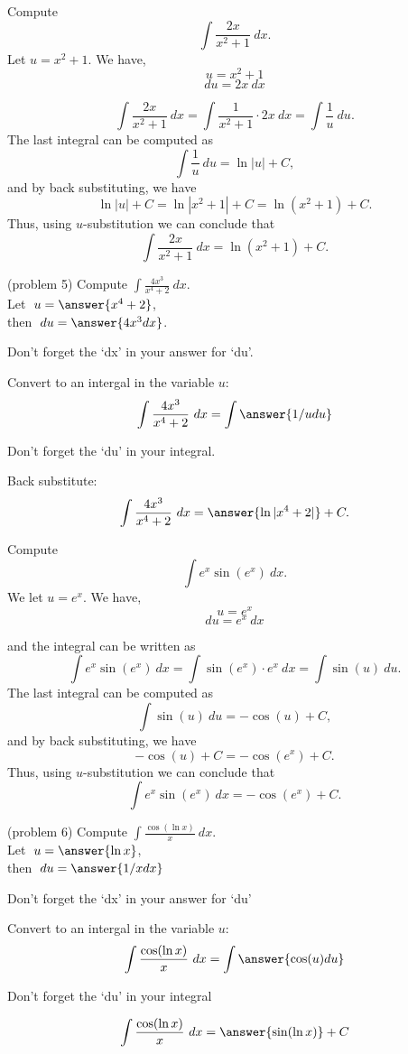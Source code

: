 \documentclass[handout]{ximera}
\begin{document}
\begin{example}[example 5] Compute 
\[\int \frac{2x}{x^2 + 1} \ dx.\]
Let $u = x^2 + 1$.  We have,
\[u = x^2 + 1\]
\[du = 2x \ dx\]

\[\int \frac{2x}{x^2 + 1} \ dx = \int \frac{1}{x^2 + 1} \cdot 2x\  dx = \int \frac{1}{u} \ du.\]
The last integral can be computed as 
\[\int \frac{1}{u} \ du = \ln|u| + C,\]
and by back substituting, we have 
\[\ln|u| + C =  \ln|x^2 + 1| + C=\ln(x^2 + 1) + C.\]
Thus, using $u$-substitution we can conclude that
\[\int \frac{2x}{x^2 + 1} \ dx =  \ln(x^2 + 1) + C.\]
\end{example}


\begin{problem} (problem 5) \hspace{0.2 in} Compute $\displaystyle{\int \frac{4x^3}{x^4 +2} \ dx}$.\\
Let $\;u = \answer{x^4 + 2}$,\\ 
then $\;du = \answer{4x^3 dx}$.\\
\begin{hint}
Don't forget the `dx' in your answer for `du'.
\end{hint}
Convert to an intergal in the variable $u$:
\[\int \frac{4x^3}{x^4 +2} \ dx = \int\answer{1/u du}\]
\begin{hint}
Don't forget the `du' in your integral.
\end{hint}
Back substitute:
\[\int \frac{4x^3}{x^4 +2} \ dx = \answer{\ln|x^4 +2|} +C.\]
\end{problem}



\begin{example}[example 6] Compute 
\[\int e^x\sin(e^x) \ dx.\]
We let $u = e^x$.  We have,
\[u = e^x\]
\[du = e^x \ dx\]

and the integral can be written as 
\[\int e^x\sin(e^x) \ dx = \int \sin(e^x) \cdot e^x \  dx = \int \sin(u) \ du.\]
The last integral can be computed as 
\[\int \sin(u) \ du = -\cos(u) + C,\]
and by back substituting, we have 
\[-\cos(u) + C = -\cos(e^x) + C.\]
Thus, using $u$-substitution we can conclude that
\[\int e^x\sin(e^x) \ dx =  -\cos(e^x) + C.\]
\end{example}




\begin{problem}(problem 6)
\hspace{.2 in} Compute $\displaystyle{\int \frac{\cos(\ln x)}{x} \ dx}$.\\
Let $\;u = \answer{\ln x}$, \\
then $\;du = \answer{1/x dx}$\\
\begin{hint}
Don't forget the `dx' in your answer for `du'
\end{hint}
Convert to an intergal in the variable $u$:
\[\int \frac{\cos(\ln x)}{x} \ dx = \int\answer{\cos(u) du}\]
\begin{hint}
Don't forget the `du' in your integral
\end{hint}

\[\int \frac{\cos(\ln x)}{x} \ dx = \answer{\sin(\ln x)} +C\]
\end{problem}
\end{document}
